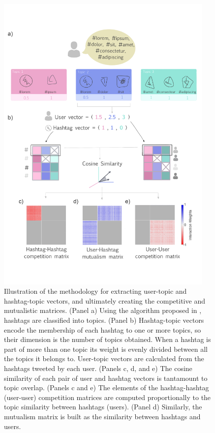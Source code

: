 \begin{figure}
   \includegraphics[width=0.95\textwidth]{figures/chp3/fig3.pdf}
    \centering
   
    \caption[Methodology for extracting user-topic and hashtag-topic vectors]{Illustration of the methodology for extracting user-topic and hashtag-topic vectors, and ultimately creating the competitive and mutualistic matrices. (Panel a) Using the algorithm proposed in \cite{cardoso2019topics}, hashtags are classified into topics. (Panel b) Hashtag-topic vectors encode the membership of each hashtag to one or more topics, so their dimension is the number of topics obtained. When a hashtag is part of more than one topic its weight is evenly divided between all the topics it belongs to. User-topic vectors are calculated from the hashtags tweeted by each user.  (Panels c, d, and e) The cosine similarity of each pair of user and hashtag vectors is tantamount to topic overlap. (Panels c and e) The elements of the hashtag-hashtag (user-user) competition matrices are computed proportionally to the topic similarity between hashtags (users). (Panel d) Similarly, the mutualism matrix is built as the similarity between hashtags and users. }
   \label{chp3:fig:3}
\end{figure}

